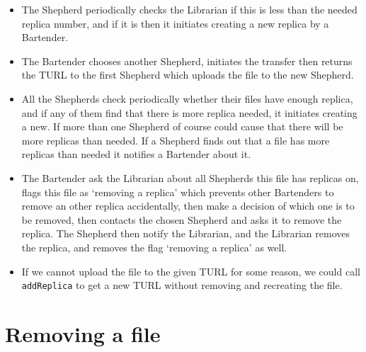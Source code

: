 \documentclass{book}
\begin{document}
\begin{itemize}
\item The Shepherd periodically checks the Librarian if this is less than the needed replica number, and if it is then it initiates creating a new replica by a Bartender.
\item The Bartender chooses another Shepherd, initiates the transfer then returns the TURL to the  first Shepherd which uploads the file to the new Shepherd.
\item All the Shepherds check periodically whether their files have enough replica, and if any of them find that there is more replica needed, it initiates creating a new. If more than one Shepherd of course could cause that there will be more replicas than needed. If a Shepherd finds out that a file has more replicas than needed it notifies a Bartender about it.
\item The Bartender ask the Librarian about all Shepherds this file has replicas on, flags this file as `removing a replica' which prevents other Bartenders to remove an other replica accidentally, then make a decision of which one is to be removed, then contacts the chosen Shepherd and asks it to remove the replica. The Shepherd then notify the Librarian, and the Librarian removes the replica, and removes the flag `removing a replica' as well.
\item If we cannot upload the file to the given TURL for some reason, we could call \verb#addReplica# to get a new TURL without removing and recreating the file.
\end{itemize}


\section{Removing a file} %
\label{sec:removing_a_file}
\end{document}
